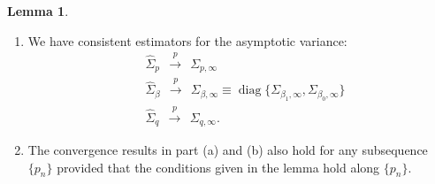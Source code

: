 \documentclass[11pt]{article}
\theoremstyle{definition}
\newtheorem{lemma}{Lemma}[section]
\DeclareMathOperator*{\diag}{diag}
\newcommand{\0}{\ensuremath{\mathbf{0}}}
\begin{document}
\begin{bibunit}
\begin{lemma}
\begin{enumerate}
\begin{align*}
		\Sigma_{\beta_{1},\infty} 
            &\equiv
			\diag\left\{\frac{\sigma_{\infty,1\ell}^2}{q_\infty(z_\ell)p_\infty(z_\ell)}:\ell = 0,1,\ldots,K\right\} \\
		\Sigma_{\beta_0, \infty} 
            &\equiv 
			\diag\left\{\frac{\sigma_{\infty,0\ell}^2}{q_\infty(z_\ell)(1-p_\infty(z_\ell))}: \ell = 0,1,\ldots,K\right\} \\
		\Sigma_{q,\infty} 
            &\equiv \{\Sigma_{q,\infty}[i,j]\}_{i,j = 0,1,\ldots,K},
	\end{align*}
        with
        \[
            \Sigma_{q,\infty}[i,j] = 
            \begin{cases}
            p_\infty(z_i) (1-p_\infty(z_i)) \\
            -p_\infty(z_i)p_\infty(z_j).
            \end{cases}
        \]
	\item[(b)] We have consistent estimators for the asymptotic variance:
	\begin{align*}
		&\hat{\Sigma}_{p}  ~~\xrightarrow{p}~~ \Sigma_{p,\infty} \\
		&\hat{\Sigma}_\beta ~~\xrightarrow{p}~~ \Sigma_{\beta,\infty} \equiv \diag\{\Sigma_{\beta_1,\infty}, \Sigma_{\beta_0, \infty}\} \\
		&\hat{\Sigma}_q ~~\xrightarrow{p}~~ \Sigma_{q,\infty}.
	\end{align*}
        \item[(c)] The convergence results in part (a) and (b) also hold for any subsequence $\{p_n\}$ provided that the conditions given in the lemma hold along $\{p_n\}$.
	\end{enumerate}
\end{lemma}



\end{bibunit}
\end{document}
